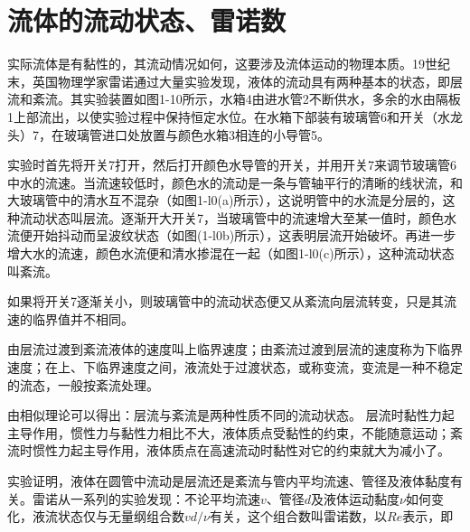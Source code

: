 \section{流体的流动状态、雷诺数}
实际流体是有黏性的，其流动情况如何，这要涉及流体运动的物理本质。19世纪末，英国物理学家雷诺通过大量实验发现，液体的流动具有两种基本的状态，即层流和紊流。其实验装置如图1-10所示，水箱4由进水管2不断供水，多余的水由隔板1上部流出，以使实验过程中保持恒定水位。在水箱下部装有玻璃管6和开关（水龙头）7，在玻璃管进口处放置与颜色水箱3相连的小导管5。

实验时首先将开关7打开，然后打开颜色水导管的开关，并用开关7来调节玻璃管6中水的流速。当流速较低时，颜色水的流动是一条与管轴平行的清晰的线状流，和大玻璃管中的清水互不混杂（如图1-l0(a)所示），这说明管中的水流是分层的，这种流动状态叫层流。逐渐开大开关7，当玻璃管中的流速增大至某一值时，颜色水流便开始抖动而呈波纹状态（如图(1-l0b)所示），这表明层流开始破坏。再进一步增大水的流速，颜色水流便和清水掺混在一起（如图1-l0(c)所示），这种流动状态叫紊流。

如果将开关7逐渐关小，则玻璃管中的流动状态便又从紊流向层流转变，只是其流速的临界值并不相同。

由层流过渡到紊流液体的速度叫上临界速度；由紊流过渡到层流的速度称为下临界速度；在上、下临界速度之间，液流处于过渡状态，或称变流，变流是一种不稳定的流态，一般按紊流处理。

由相似理论可以得出：层流与紊流是两种性质不同的流动状态。 层流时黏性力起主导作用，惯性力与黏性力相比不大，液体质点受黏性的约束，不能随意运动；紊流时惯性力起主导作用，液体质点在高速流动时黏性对它的约束就大为减小了。

实验证明，液体在圆管中流动是层流还是紊流与管内平均流速、管径及液体黏度有关。雷诺从一系列的实验发现：不论平均流速$v$、管径$d$及液体运动黏度$\nu $如何变化，液流状态仅与无量纲组合数$vd/\nu $有关，这个组合数叫雷诺数，以$Re$表示，即